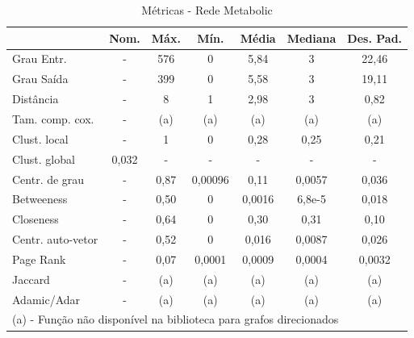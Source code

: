 \documentclass[12pt,a4paper]{article}
\begin{document}
	\begin{table}[H]
		\caption{Métricas - Rede Metabolic}
		\label{tab:metabolic}
		\centering
		\begin{tabular}{l|c|c|c|c|c|c}
			& \textbf{Nom.} & \textbf{Máx.} & \textbf{Mín.} & \textbf{Média} & \textbf{Mediana} & \textbf{Des. Pad.} \\\hline
			Grau Entr.        & -                                 & 576           & 0             & 5,84           & 3                & 22,46              \\\hline
			Grau Saída        & -                                 & 399           & 0             & 5,58           & 3                & 19,11              \\\hline
			Distância         & -                                 & 8             & 1             & 2,98           & 3                & 0,82               \\\hline
			Tam. comp. cox.   & -                                 & (a)           & (a)           & (a)            & (a)              & (a)                \\\hline
			Clust. local      & -                                 & 1             & 0             & 0,28           & 0,25             & 0,21               \\\hline
			Clust. global     & 0,032                             & -             & -             & -              & -                & -                  \\\hline
			Centr. de grau    & -                                 & 0,87          & 0,00096       & 0,11           & 0,0057           & 0,036              \\\hline
			Betweeness        & -                                 & 0,50          & 0             & 0,0016         & 6,8e-5           & 0,018              \\\hline
			Closeness         & -                                 & 0,64          & 0             & 0,30           & 0,31             & 0,10               \\\hline
			Centr. auto-vetor & -                                 & 0,52          & 0             & 0,016          & 0,0087           & 0,026              \\\hline
			Page Rank         & -                                 & 0,07          & 0,0001        & 0,0009         & 0,0004           & 0,0032             \\\hline
			Jaccard           & -                                 & (a)           & (a)           & (a)            & (a)              & (a)                \\\hline
			Adamic/Adar       & -                                 & (a)           & (a)           & (a)            & (a)              & (a) \\
			\multicolumn{7}{l}{(a) - Função não disponível na biblioteca para grafos direcionados}              
		\end{tabular}
	\end{table}
		
\end{document}
